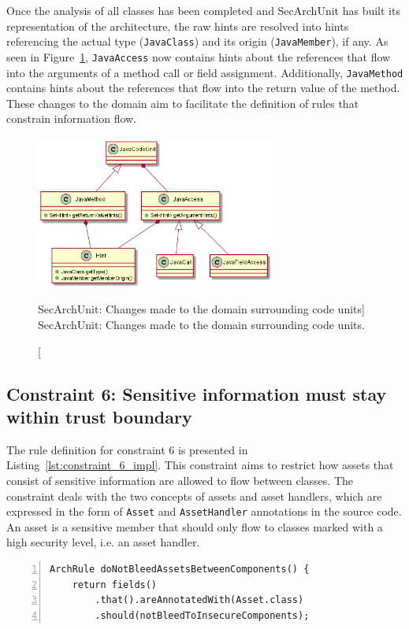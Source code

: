 Once the analysis of all classes has been completed and SecArchUnit has built its representation of the architecture, the raw hints are resolved into hints referencing the actual type (\texttt{JavaClass}) and its origin (\texttt{JavaMember}), if any. As seen in Figure~\ref{fig:domain_changes_1}, \texttt{JavaAccess} now contains hints about the references that flow into the arguments of a method call or field assignment. Additionally, \texttt{JavaMethod} contains hints about the references that flow into the return value of the method. These changes to the domain aim to facilitate the definition of rules that constrain information flow.

\begin{figure}
    \centering
    \includegraphics[width=0.7\textwidth]{figure/extension/DomainChanges1.png}
    \caption
        [SecArchUnit: Changes made to the domain surrounding code units]
        {SecArchUnit: Changes made to the domain surrounding code units.}
    \label{fig:domain_changes_1}
\end{figure}

\subsection{Constraint 6: Sensitive information must stay within trust boundary}
The rule definition for constraint 6 is presented in Listing~\ref{lst:constraint_6_impl}.
This constraint aims to restrict how assets that consist of sensitive information are allowed to flow between classes. The constraint deals with the two concepts of assets and asset handlers, which are expressed in the form of \texttt{Asset} and \texttt{AssetHandler} annotations in the source code. An asset is a sensitive member that should only flow to classes marked with a high security level, i.e. an asset handler.

\begin{minipage}{\linewidth}
\begin{lstlisting}[caption={Rule definition for constraint 6.}, captionpos=b, label=lst:constraint_6_impl, numbers=left]
ArchRule doNotBleedAssetsBetweenComponents() {
    return fields()
        .that().areAnnotatedWith(Asset.class)
        .should(notBleedToInsecureComponents);
\end{lstlisting}
\end{minipage}

